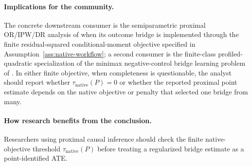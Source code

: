 \documentclass[11pt]{article}
\theoremstyle{definition}
\theoremstyle{plain}
\theoremstyle{remark}
\begin{document}
\paragraph{Implications for the community.}
The concrete downstream consumer is the semiparametric proximal OR/IPW/DR
analysis of \citet{CuiPuShiMiaoTchetgen2024JASA} when its outcome bridge is
implemented through the finite residual-squared conditional-moment objective
specified in Assumption~\ref{ass:native-workflow}; a second consumer is the
finite-class profiled-quadratic specialization of the minimax
negative-control bridge learning problem of
\citet{KallusMaoUehara2021MinimaxNC}.  In either finite objective, when
completeness is questionable, the analyst should report whether
\(\tau_{\mathrm{native}}(P)=0\) or whether the reported proximal point
estimate depends on the native objective or penalty that selected one bridge
from many.

\paragraph{How research benefits from the conclusion.}
Researchers using proximal causal inference should check the finite
native-objective threshold \(\tau_{\mathrm{native}}(P)\) before treating a
regularized bridge estimate as a point-identified ATE.
\end{document}
